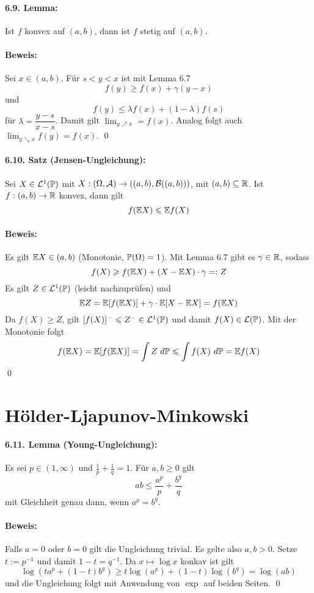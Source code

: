  \paragraph{6.9. Lemma:}Ist $f$ konvex auf $(a,b)$, dann ist $f$ stetig auf $(a,b)$.
 
 \paragraph{Beweis:}Sei $x\in(a,b)$. F\"ur $s<y<x$ ist mit Lemma 6.7
 $$f(y)\geq f(x)+\gamma (y-x)$$
 und 
 $$f(y)\leq \lambda f(x)+(1-\lambda)f(s)$$
 f\"ur $\lambda=\dfrac{y-s}{x-s}$. Damit gilt $\displaystyle\lim_{y\nearrow x}=f(x)$. Analog folgt auch $\lim_{y\searrow x}f(y)=f(x)$. \qed
 
 \paragraph{6.10. Satz (Jensen-Ungleichung):}Sei $X\in\mathcal{L}^1(\mathbb{P})$ mit $X:(\Omega,\mathcal{A})\to((a,b),\mathcal{B}((a,b)))$, mit $(a,b)\subseteq\mathbb{R}$. Ist $f:(a,b)\to\mathbb{R}$ konvex, dann gilt
 $$f(\mathbb{E} X)\leqslant \mathbb{E} f(X)$$
 
 \paragraph{Beweis:}Es gilt $\mathbb{E} X\in (a,b)$ (Monotonie, $\mathbb{P}(\Omega)=1$). Mit Lemma 6.7 gibt es $\gamma\in\mathbb{R}$, sodass
 $$f(X)\geqslant f(\mathbb{E} X)+(X-\mathbb{E} X)\cdot \gamma=:Z$$
 Es gilt $Z\in\mathcal{L}^1(\mathbb{P})$ (leicht nachzupr\"ufen) und 
 $$\mathbb{E} Z=\mathbb{E}[f(\mathbb{E} X)]+\gamma\cdot \mathbb{E}[X-\mathbb{E} X]=f(\mathbb{E} X)$$
 Da $f(X)\geq Z$, gilt $[f(X)]^-\leqslant Z^-\in\mathcal{L}^1(\mathbb{P})$ und damit $f(X)\in\mathcal{L}(\mathbb{P})$. Mit der Monotonie folgt 
 $$f(\E X)=\E[f(\E X)]=\int Z\ d\Pp\leq\int f(X)\ d\Pp=\E f(X)$$
 \qed
 
\section*{H\"older-Ljapunov-Minkowski}

\paragraph{6.11. Lemma (Young-Ungleichung):} Es sei $p\in(1,\infty)$ und $\frac{1}{p}+\frac{1}{q}=1$. F\"ur $a,b\geq0$ gilt
$$ab\leq\dfrac{a^p}{p}+\dfrac{b^q}{q}$$
mit Gleichheit genau dann, wenn $a^p=b^q$.

\paragraph{Beweis:}Falls $a=0$ oder $b=0$ gilt die Ungleichung trivial. Es gelte also $a,b>0$. Setze $t:=p^{-1}$ und damit $1-t=q^{-1}$. Da $x\mapsto \log x$ konkav ist gilt
$$\log\left(ta^p+(1-t)b^q\right)\geq t\log\left(a^p\right)+(1-t)\log\left(b^q\right)=\log(ab)$$
und die Ungleichung folgt mit Anwendung von $\exp$ auf beiden Seiten. \qed

